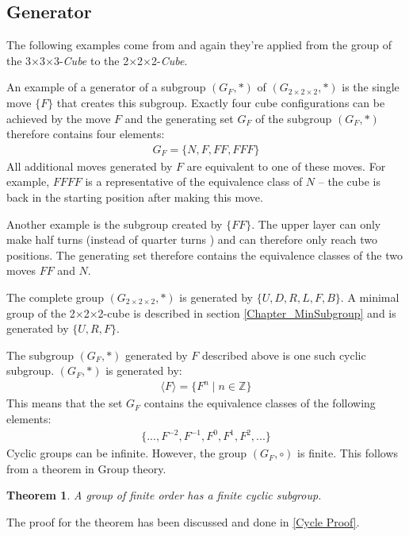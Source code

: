 \documentclass[12pt,a4paper]{article}
\theoremstyle{custom}
\newtheorem*{theorem}{Theorem}
\newcommand{\Gtwo}{\ensuremath{G_{2\times 2\times 2}}}
\newcommand{\Ttwo}{2$\times$2$\times$2-}
\newcommand{\Tthree}{3$\times$3$\times$3-}
\begin{document}
\subsection{Generator}
\label{section_GeneratorGF}

The following examples come from \cite{TD} and again they're applied from the group of the \Tthree \textit{Cube} to the \Ttwo \textit{Cube}. 

An example of a generator of a subgroup $\left(G_F, \scriptstyle*\right)$ of $\left(\Gtwo, \scriptstyle*\right)$ is the single move $\{ F \}$ that creates this subgroup. Exactly four cube configurations can be achieved by the move $F$ and the generating set $G_F$ of the subgroup $\left(G_F, \scriptstyle*\right)$ therefore contains four elements:
\begin{align*}
G_F = \{N, F, FF, FFF\}
\end{align*}
All additional moves generated by $F$ are equivalent to one of these moves. For example, $FFFF$ is a representative of the equivalence class of $N$ -- the cube is back in the starting position after making this move.


Another example is the subgroup created by $\{FF\}$. The upper layer can only make half turns (instead of quarter turns \cite{TR}) and can therefore only reach two positions. The generating set therefore contains the equivalence classes of the two moves $FF$ and $N$.

The complete group $\left(\Gtwo, \scriptstyle* \right)$ is generated by $\{U, D, R, L, F, B\}$. A minimal group of the \Ttwo cube is described in section \ref{Chapter_MinSubgroup} and is generated by $\{U, R, F\}$.

The subgroup $\left(G_F, \scriptstyle*\right)$ generated by $F$ described above is one such cyclic subgroup.
$\left(G_F, \scriptstyle*\right)$ is generated by:
\begin{align*}
\langle F \rangle = \{ F^n \mid n \in \mathbb{Z}\}
\end{align*}
This means that the  set $G_F$ contains the equivalence classes of the following elements:
\begin{align*}
\{..., F^{-2}, F^{-1}, F^0, F^1, F^2, ...\}
\end{align*}
Cyclic groups can be infinite. However, the group $(G_F, \circ)$ is finite. 
This follows from a theorem in Group theory. 
\begin{theorem}
A group of finite order has a finite cyclic subgroup. 
\end{theorem}
The proof for the theorem has been discussed and done in \ref{Cycle Proof}. 
\end{document}
